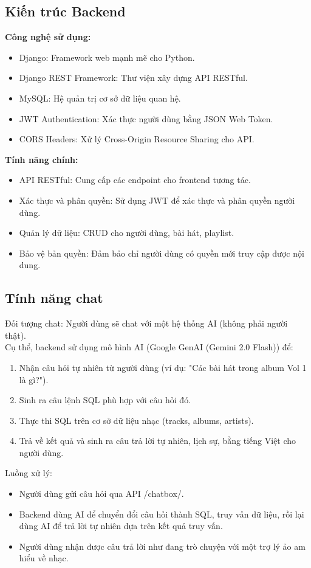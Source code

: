 \documentclass[a4paper]{article}
\begin{document}
\subsection{Kiến trúc Backend}
    \textbf{Công nghệ sử dụng:}
    \begin{itemize}
        \item Django: Framework web mạnh mẽ cho Python.
        \item Django REST Framework: Thư viện xây dựng API RESTful.
        \item MySQL: Hệ quản trị cơ sở dữ liệu quan hệ.
        \item JWT Authentication: Xác thực người dùng bằng JSON Web Token.
        \item CORS Headers: Xử lý Cross-Origin Resource Sharing cho API.
    \end{itemize}
    \textbf{Tính năng chính:}
    \begin{itemize}
        \item API RESTful: Cung cấp các endpoint cho frontend tương tác.
        \item Xác thực và phân quyền: Sử dụng JWT để xác thực và phân quyền người dùng.
        \item Quản lý dữ liệu: CRUD cho người dùng, bài hát, playlist.
        \item Bảo vệ bản quyền: Đảm bảo chỉ người dùng có quyền mới truy cập được nội dung.
    \end{itemize}

    \subsection{Tính năng chat}
    Đối tượng chat:
    Người dùng sẽ chat với một hệ thống AI (không phải người thật).\\
    Cụ thể, backend sử dụng mô hình AI (Google GenAI (Gemini 2.0 Flash)) để:\\
    \begin{enumerate}
        \item Nhận câu hỏi tự nhiên từ người dùng (ví dụ: "Các bài hát trong album Vol 1 là gì?").
        \item Sinh ra câu lệnh SQL phù hợp với câu hỏi đó.
        \item Thực thi SQL trên cơ sở dữ liệu nhạc (tracks, albums, artists).
        \item Trả về kết quả và sinh ra câu trả lời tự nhiên, lịch sự, bằng tiếng Việt cho người dùng.
    \end{enumerate}
    Luồng xử lý:
        \begin{itemize}
            \item Người dùng gửi câu hỏi qua API /chatbox/.
            \item Backend dùng AI để chuyển đổi câu hỏi thành SQL, truy vấn dữ liệu, rồi lại dùng AI để trả lời tự nhiên dựa trên kết quả truy vấn.
            \item Người dùng nhận được câu trả lời như đang trò chuyện với một trợ lý ảo am hiểu về nhạc.
        \end{itemize}
\end{document}
